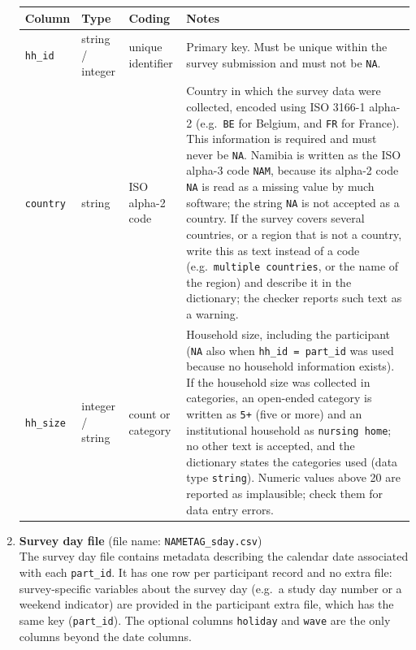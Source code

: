 \documentclass[11pt,a4paper]{article}
\begin{document}
\begin{enumerate}
    \begin{table}[H]
        \centering
        \begin{tabularx}{\textwidth}{l l l X}
        \toprule
        \textbf{Column} & \textbf{Type} & \textbf{Coding} & \textbf{Notes} \\
        \midrule
        \texttt{hh\_id} &
        string / integer &
        unique identifier &
        Primary key. Must be unique within the survey submission and must not be \texttt{NA}. \\

        \texttt{country} &
        string &
        ISO alpha-2 code &
        Country in which the survey data were collected, encoded using ISO 3166-1 alpha-2 (e.g.\ \texttt{BE} for Belgium, and \texttt{FR} for France). This information is required and must never be \texttt{NA}. Namibia is written as the ISO alpha-3 code \texttt{NAM}, because its alpha-2 code \texttt{NA} is read as a missing value by much software; the string \texttt{NA} is not accepted as a country. If the survey covers several countries, or a region that is not a country, write this as text instead of a code (e.g.\ \texttt{multiple countries}, or the name of the region) and describe it in the dictionary; the checker reports such text as a warning. \\

        \texttt{hh\_size} &
        integer / string &
        count or category &
        Household size, including the participant (\texttt{NA} also when \texttt{hh\_id = part\_id} was used because no household information exists). If the household size was collected in categories, an open-ended category is written as \texttt{5+} (five or more) and an institutional household as \texttt{nursing home}; no other text is accepted, and the dictionary states the categories used (data type \texttt{string}). Numeric values above 20 are reported as implausible; check them for data entry errors. \\
        
        \bottomrule
        \end{tabularx}
    \end{table}

    \item \textbf{Survey day file} (file name: \texttt{NAMETAG\_sday.csv})\\
    The survey day file contains metadata describing the calendar date associated with each \texttt{part\_id}. It has one row per participant record and no extra file: survey-specific variables about the survey day (e.g.\ a study day number or a weekend indicator) are provided in the participant extra file, which has the same key (\texttt{part\_id}). The optional columns \texttt{holiday} and \texttt{wave} are the only columns beyond the date columns. 


\end{enumerate}
\end{document}
